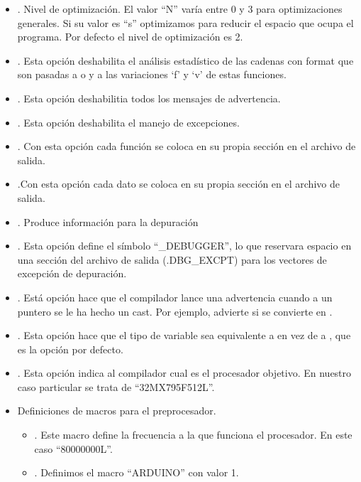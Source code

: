 \begin{itemize}
    \item {}. Nivel de optimización. El valor ``N'' varía entre 0 y 3 para optimizaciones generales. Si su valor es ``s'' optimizamos para reducir el espacio que ocupa el programa. Por defecto el nivel de optimización es 2.
    \item {}. Esta opción deshabilita el análisis estadístico de las cadenas con format que son pasadas a  o  y a las variaciones `f' y `v' de estas funciones.
    \item {}. Esta opción deshabilitia todos los mensajes de advertencia.
    \item {}. Esta opción deshabilita el manejo de excepciones.
    \item {}. Con esta opción cada función se coloca en su propia sección en el archivo de salida.
    \item {}.Con esta opción cada dato se coloca en su propia sección en el archivo de salida.
    \item {}. Produce información para la depuración
    \item {}. Esta opción define el símbolo ``\_DEBUGGER'', lo que reservara espacio en una sección del archivo de salida (.DBG\_EXCPT) para los vectores de excepción de depuración.
    \item {}. Está opción hace que el compilador lance una advertencia cuando a un puntero se le ha hecho un cast. Por ejemplo, advierte si  se convierte en .
    \item {}. Esta opción hace que el tipo de variable  sea equivalente a  en vez de a , que es la opción por defecto.
    \item {}. Esta opción indica al compilador cual es el procesador objetivo. En nuestro caso particular se trata de ``32MX795F512L''.
    \item Definiciones de macros para el preprocesador.
    \begin{itemize}
        \item {}. Este macro define la frecuencia a la que funciona el procesador. En este caso ``80000000L''.
        \item {}. Definimos el macro ``ARDUINO'' con valor 1.

\end{itemize}
\end{itemize}
